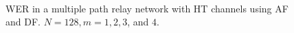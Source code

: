 \begin{figure}
{	 \\
}
\caption{WER in a multiple path relay network with HT channels using AF and DF.  $N = 128, m = 1, 2, 3$, and $4$.}
\label{fig:mp_af_df_wer_plots_HT}
\end{figure}
